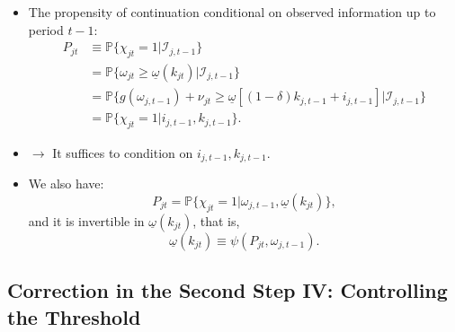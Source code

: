 \documentclass[
]{book}
\providecommand{\tightlist}{%
  \setlength{\itemsep}{0pt}\setlength{\parskip}{0pt}}
\begin{document}
\begin{itemize}
\tightlist
\item
  The propensity of continuation conditional on observed information up to period \(t - 1\):
  \begin{equation}
  \begin{split}
  P_{jt} &\equiv \mathbb{P}\{\chi_{jt} = 1|\mathcal{I}_{j, t - 1}\}\\
  &= \mathbb{P}\{\omega_{jt} \ge \underline{\omega}(k_{jt}) |\mathcal{I}_{j, t - 1}\}\\
  &= \mathbb{P}\{g(\omega_{j, t - 1}) + \nu_{jt} \ge \underline{\omega}[(1 - \delta) k_{j, t - 1} + i_{j, t - 1}]|\mathcal{I}_{j, t - 1} \}\\
  &= \mathbb{P}\{ \chi_{jt} = 1| i_{j, t - 1}, k_{j, t - 1}\}.
  \end{split}
  \end{equation}
\item
  \(\rightarrow\) It suffices to condition on \(i_{j, t - 1}, k_{j, t - 1}\).
\item
  We also have:
  \begin{equation}
  P_{jt} = \mathbb{P}\{\chi_{jt} = 1| \omega_{j, t - 1}, \underline{\omega}(k_{jt})\},
  \end{equation}
  and it is invertible in \(\underline{\omega}(k_{jt})\), that is,
  \begin{equation}
  \underline{\omega}(k_{jt}) \equiv \psi(P_{jt}, \omega_{j, t - 1}).
  \end{equation}
\end{itemize}

\hypertarget{correction-in-the-second-step-iv-controlling-the-threshold}{%
\subsection{Correction in the Second Step IV: Controlling the Threshold}\label{correction-in-the-second-step-iv-controlling-the-threshold}}
\end{document}
